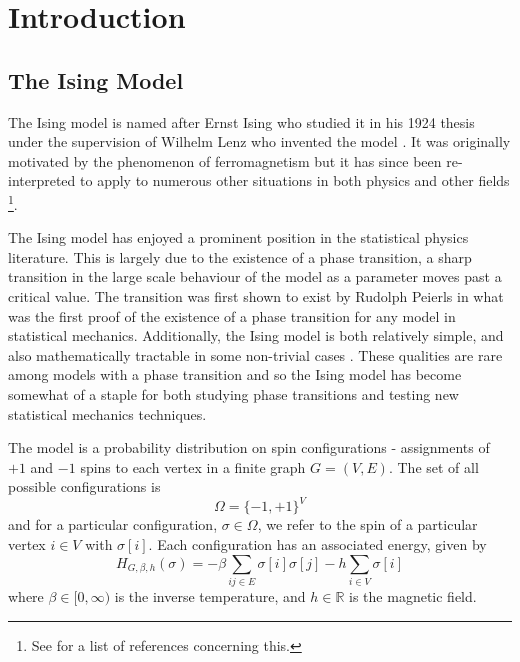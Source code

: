 \chapter{Introduction}
\label{Ch:CouplingIntro}



\section{The Ising Model}
\label{sec:Ising}
	The Ising model is named after Ernst Ising who studied it in his 1924 thesis \cite{Ising1925-nd} under the supervision of Wilhelm Lenz who invented the model \cite{Lenz1920-bn}. It was originally motivated by the phenomenon of ferromagnetism but it has since been re-interpreted to apply to numerous other situations in both physics and other fields \footnote{See \cite[notes of Section 1.4.2]{Friedli2017-xm} for a list of references concerning this.}.

	The Ising model has enjoyed a prominent position in the statistical physics literature. This is largely due to the existence of a phase transition, a sharp transition in the large scale behaviour of the model as a parameter moves past a critical value. The transition was first shown to exist by Rudolph Peierls \cite{Peierls1936-pu} in what was the first proof of the existence of a phase transition for any model in statistical mechanics.
	Additionally, the Ising model is both relatively simple, and also mathematically tractable in some non-trivial cases \cite{Onsager1944-li}. These qualities are rare among models with a phase transition and so the Ising model has become somewhat of a staple for both studying phase transitions and testing new statistical mechanics techniques.

	The model is a probability distribution on spin configurations - assignments of $+1$ and $-1$ spins to each vertex in a finite graph $G = (V, E)$. The set of all possible configurations is
	\begin{equation}
		\Omega = \{-1, +1\}^V
	\end{equation}
	and for a particular configuration, $\sigma \in \Omega$, we refer to the spin of a particular vertex $i \in V$ with $\sigma[i]$. Each configuration has an associated energy, given by 
	\begin{equation}
		H_{G, \beta, h}(\sigma) = -\beta \sum_{ij \in E} \sigma[i] \sigma[j] - h\sum_{i \in V} \sigma[i]
	\end{equation}
	where $\beta \in [0, \infty)$ is the inverse temperature, and $h \in \mathbb{R}$ is the magnetic field. 

